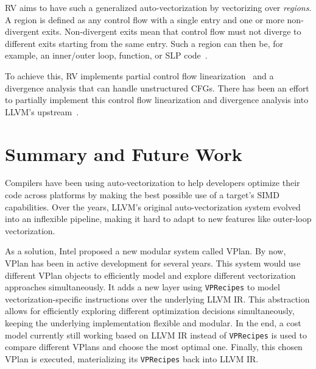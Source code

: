 \documentclass[sigplan,11pt,nonacm]{acmart}
\begin{document}
RV aims to have such a generalized auto-vectorization by vectorizing over \textit{regions}.
A region is defined as any control flow with a single entry and one or more non-divergent exits.
Non-divergent exits mean that control flow must not diverge to different exits starting from the 
same entry.
Such a region can then be, for example, an inner/outer loop, function, or SLP code~\cite{rvintro,rvproposal}.

To achieve this, RV implements partial control flow linearization~\cite{10.1145/3192366.3192413}
and a divergence analysis that can handle unstructured CFGs. There has been an effort to partially
implement this control flow linearization and divergence analysis into LLVM's 
upstream~\cite{rvproposal,rvproposaldep}.




\section{Summary and Future Work}
\label{sec:summary}
Compilers have been using auto-vectorization to help developers optimize their code 
across platforms by making the best possible use of a target's SIMD capabilities. Over the years, 
LLVM's original auto-vectorization system evolved into an inflexible pipeline, making it hard 
to adapt to new features like outer-loop vectorization.

As a solution, Intel proposed a new modular system called VPlan.
By now, VPlan has been in active development for several years. 
This system would use different VPlan objects to efficiently 
model and explore different vectorization approaches simultaneously.
It adds a new layer using \texttt{VPRecipes} to model 
vectorization-specific instructions over the underlying LLVM IR. 
This abstraction allows for efficiently exploring different optimization decisions simultaneously, 
keeping the underlying implementation flexible and modular. In the end, a cost model currently still 
working based on LLVM IR instead of \texttt{VPRecipes} is used to compare different VPlans 
and choose the most optimal one. Finally, this chosen VPlan is executed, materializing its \texttt{VPRecipes} 
back into LLVM IR.
\end{document}
